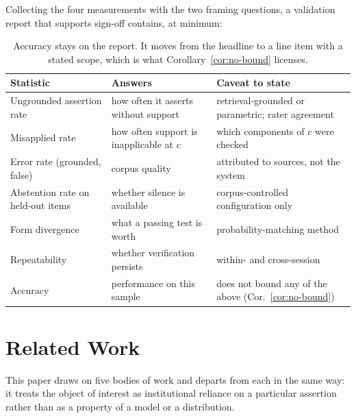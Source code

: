 \documentclass[11pt]{article}
\theoremstyle{plain}
\theoremstyle{definition}
\begin{document}
Collecting the four measurements with the two framing questions, a validation report
that supports sign-off contains, at minimum:

\begin{table}[ht]
  \centering
  \small
  \begin{tabular}{@{}>{\raggedright\arraybackslash}p{4.2cm}>{\raggedright\arraybackslash}p{4.0cm}>{\raggedright\arraybackslash}p{5.4cm}@{}}
    \toprule
    Statistic & Answers & Caveat to state \\
    \midrule
    Ungrounded assertion rate
      & how often it asserts without support
      & retrieval-grounded or parametric; rater agreement \\
    \addlinespace
    Misapplied rate
      & how often support is inapplicable at $c$
      & which components of $c$ were checked \\
    \addlinespace
    Error rate (grounded, false)
      & corpus quality
      & attributed to sources, not the system \\
    \addlinespace
    Abstention rate on held-out items
      & whether silence is available
      & corpus-controlled configuration only \\
    \addlinespace
    Form divergence
      & what a passing test is worth
      & probability-matching method \\
    \addlinespace
    Repeatability
      & whether verification persists
      & within- and cross-session \\
    \addlinespace
    Accuracy
      & performance on this sample
      & does not bound any of the above (Cor.~\ref{cor:no-bound}) \\
    \bottomrule
  \end{tabular}
  \caption{Accuracy stays on the report. It moves from the headline to a line item
    with a stated scope, which is what Corollary~\ref{cor:no-bound} licenses.}
  \label{tab:report}
\end{table}


\section{Related Work}
\label{sec:related}

This paper draws on five bodies of work and departs from each in the same way: it
treats the object of interest as institutional reliance on a particular assertion
rather than as a property of a model or a distribution.
\end{document}
